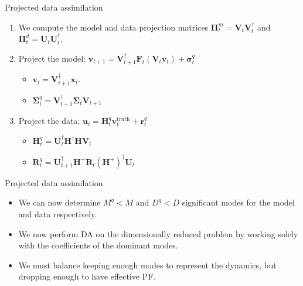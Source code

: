 \documentclass[aspectratio=169]{beamer}
\newcommand{\state}{\boldsymbol{x}}
\newcommand{\modelcovariance}{\boldsymbol{\Sigma}}
\newcommand{\observationcovariance}{\boldsymbol{R}}
\newcommand{\modelf}{\boldsymbol{F}}
\newcommand{\projectedstate}{\boldsymbol{v}}
\begin{document}
\begin{frame}{Projected data assimilation}
\vfill
    \begin{enumerate}
    \pause
        \item We compute the model and data projection matrices $\boldsymbol{\Pi}_t^m = \boldsymbol{V}_t \boldsymbol{V}_t^\dagger$ and $\boldsymbol{\Pi}_t^d = \boldsymbol{U}_t \boldsymbol{U}_t^\dagger$.
    \pause
        \item Project the model: $\projectedstate_{t+1} = \boldsymbol{V}_{t+1}^\dagger \modelf_t(\boldsymbol{V}_t \projectedstate_t) + \boldsymbol{\sigma}_t^q$
        \begin{itemize}
            \item $\projectedstate_t=\boldsymbol{V}_{t+1}^\dagger \state_t$.
            \item $\modelcovariance^q_t = \boldsymbol{V}_{t+1}^\dagger \modelcovariance_t \boldsymbol{V}_{t+1}$
        \end{itemize}
    \pause
        \item Project the data: $\boldsymbol{u}_t=\boldsymbol{H}^q_t \projectedstate_t^{\textrm{truth}} + \boldsymbol{r}^q_t$
        \begin{itemize}
            \item $\boldsymbol{H}^q_t = \boldsymbol{U}_t^\dagger \boldsymbol{H}^\dagger \boldsymbol{H} \boldsymbol{V}_t$
            \item $\observationcovariance^q_t = \boldsymbol{U}_{t+1}^\dagger \boldsymbol{H}^+ \observationcovariance_t (\boldsymbol{H}^+)^\dagger \boldsymbol{U}_{t}$
        \end{itemize}
\end{enumerate}
\vfill
\end{frame}


\begin{frame}{Projected data assimilation}
\vfill
    \begin{itemize}
    \pause
        \item We can now determine $M^q<M$ and $D^q<D$ significant modes for the model and data respectively.
    \pause
        \item We now perform DA on the dimensionally reduced problem by working solely with the coefficients of the dominant modes.
    \pause
        \item We must balance keeping enough modes to represent the dynamics, but dropping enough to have effective PF.
    \end{itemize}
\vfill
\end{frame}
\end{document}
